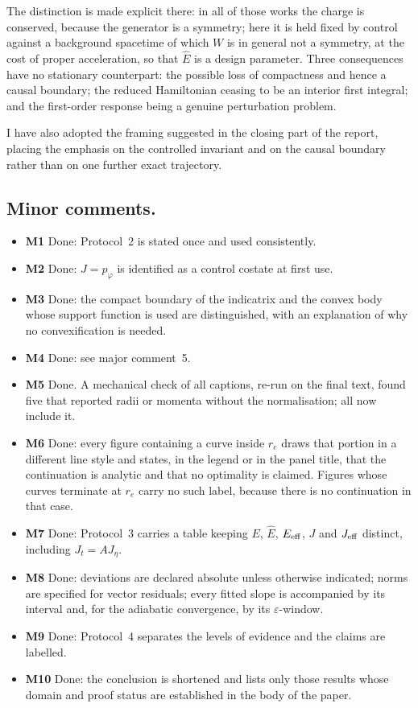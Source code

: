 \documentclass{article}
\begin{document}
The distinction is made explicit there: in all of those works the charge is
conserved, because the generator is a symmetry; here it is held fixed by control
against a background spacetime of which \(W\) is in general not a symmetry, at the
cost of proper acceleration, so that \(\hat E\) is a design parameter. Three
consequences have no stationary counterpart: the possible loss of compactness and
hence a causal boundary; the reduced Hamiltonian ceasing to be an interior first
integral; and the first-order response being a genuine perturbation problem.

I have also adopted the framing suggested in the closing part of the report, placing
the emphasis on the controlled invariant and on the causal boundary rather than on
one further exact trajectory.

\subsection{Minor comments.}
\begin{itemize}
    \item \textbf{M1} Done: Protocol~2 is stated once and used consistently.
    \item \textbf{M2} Done: \(J=p_\varphi\) is identified as a control costate at
    first use.
    \item \textbf{M3} Done: the compact boundary of the indicatrix and the convex
    body whose support function is used are distinguished, with an explanation of
    why no convexification is needed.
    \item \textbf{M4} Done: see major comment~5.
    \item \textbf{M5} Done. A mechanical check of all captions, re-run on the final
    text, found five that reported radii or momenta without the normalisation; all
    now include it.
    \item \textbf{M6} Done: every figure containing a curve inside \(r_e\) draws
    that portion in a different line style and states, in the legend or in the panel
    title, that the continuation is analytic and that no optimality is claimed.
    Figures whose curves terminate at \(r_e\) carry no such label, because there is
    no continuation in that case.
    \item \textbf{M7} Done: Protocol~3 carries a table keeping
    \(E\), \(\hat E\), \(E_{\rm eff}\), \(J\) and \(J_{\rm eff}\) distinct,
    including \(J_t = AJ_\eta\).
    \item \textbf{M8} Done: deviations are declared absolute unless otherwise
    indicated; norms are specified for vector residuals; every fitted slope is
    accompanied by its interval and, for the adiabatic convergence, by its
    \(\varepsilon\)-window.
    \item \textbf{M9} Done: Protocol~4 separates the levels of evidence and the
    claims are labelled.
    \item \textbf{M10} Done: the conclusion is shortened and lists only those
    results whose domain and proof status are established in the body of the paper.
\end{itemize}
\end{document}
